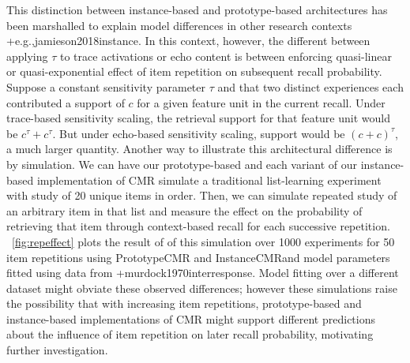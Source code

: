 {}This distinction between instance-based and prototype-based architectures has been marshalled to explain model differences in other research contexts +{e.g.,}{}{jamieson2018instance}. In this context, however, the different between applying $\tau$ to trace activations or echo content is between enforcing quasi-linear or quasi-exponential effect of item repetition on subsequent recall probability. Suppose a constant sensitivity parameter $\tau$ and that two distinct experiences each contributed a support of $c$ for a given feature unit in the current recall. Under trace-based sensitivity scaling, the retrieval support for that feature unit would be $c^{\tau} + c^{\tau}$. But under echo-based sensitivity scaling, support would be ${(c + c)}^{\tau}$, a much larger quantity.\markdownRendererInterblockSeparator
{}Another way to illustrate this architectural difference is by simulation. We can have our prototype-based and each variant of our instance-based implementation of CMR simulate a traditional list-learning experiment with study of 20 unique items in order. Then, we can simulate repeated study of an arbitrary item in that list and measure the effect on the probability of retrieving that item through context-based recall for each successive repetition. ~\ref{fig:repeffect} plots the result of of this simulation over 1000 experiments for 50 item repetitions using PrototypeCMR and InstanceCMRand model parameters fitted using data from +{}{}{murdock1970interresponse}. Model fitting over a different dataset might obviate these observed differences; however these simulations raise the possibility that with increasing item repetitions, prototype-based and instance-based implementations of CMR might support different predictions about the influence of item repetition on later recall probability, motivating further investigation.\relax